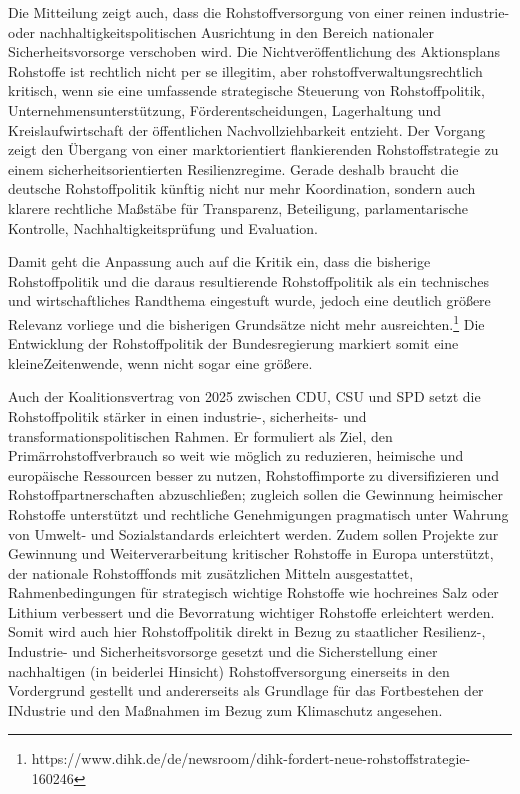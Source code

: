 \documentclass[12pt,a4paper,oneside]{book} %
\begin{document}
Die Mitteilung zeigt auch, dass die Rohstoffversorgung von einer reinen industrie- oder nachhaltigkeitspolitischen Ausrichtung in den Bereich nationaler Sicherheitsvorsorge verschoben wird. Die Nichtveröffentlichung des Aktionsplans Rohstoffe ist rechtlich nicht per se illegitim, aber rohstoffverwaltungsrechtlich kritisch, wenn sie eine umfassende strategische Steuerung von Rohstoffpolitik, Unternehmensunterstützung, Förderentscheidungen, Lagerhaltung und Kreislaufwirtschaft der öffentlichen Nachvollziehbarkeit entzieht. Der Vorgang zeigt den Übergang von einer marktorientiert flankierenden Rohstoffstrategie zu einem sicherheitsorientierten Resilienzregime. Gerade deshalb braucht die deutsche Rohstoffpolitik künftig nicht nur mehr Koordination, sondern auch klarere rechtliche Maßstäbe für Transparenz, Beteiligung, parlamentarische Kontrolle, Nachhaltigkeitsprüfung und Evaluation.

Damit geht die Anpassung auch auf die Kritik ein, dass die bisherige Rohstoffpolitik und die daraus resultierende Rohstoffpolitik als ein technisches und wirtschaftliches Randthema eingestuft wurde, jedoch eine deutlich größere Relevanz vorliege und die bisherigen Grundsätze nicht mehr ausreichten.\footnote{https://www.dihk.de/de/newsroom/dihk-fordert-neue-rohstoffstrategie-160246} Die Entwicklung der Rohstoffpolitik der Bundesregierung markiert somit eine \glqq kleine\grqq Zeitenwende,\autocite{FRenz 2025, S. 758} wenn nicht sogar eine größere.

Auch der Koalitionsvertrag von 2025 zwischen CDU, CSU und SPD setzt die Rohstoffpolitik stärker in einen industrie-, sicherheits- und transformationspolitischen Rahmen. Er formuliert als Ziel, den Primärrohstoffverbrauch so weit wie möglich zu reduzieren, heimische und europäische Ressourcen besser zu nutzen, Rohstoffimporte zu diversifizieren und Rohstoffpartnerschaften abzuschließen; zugleich sollen die Gewinnung heimischer Rohstoffe unterstützt und rechtliche Genehmigungen pragmatisch unter Wahrung von Umwelt- und Sozialstandards erleichtert werden. Zudem sollen Projekte zur Gewinnung und Weiterverarbeitung kritischer Rohstoffe in Europa unterstützt, der nationale Rohstofffonds mit zusätzlichen Mitteln ausgestattet, Rahmenbedingungen für strategisch wichtige Rohstoffe wie hochreines Salz oder Lithium verbessert und die Bevorratung wichtiger Rohstoffe erleichtert werden. Somit wird auch hier Rohstoffpolitik direkt in Bezug zu staatlicher Resilienz-, Industrie- und Sicherheitsvorsorge gesetzt und die Sicherstellung einer nachhaltigen (in beiderlei Hinsicht) Rohstoffversorgung einerseits in den Vordergrund gestellt und andererseits als Grundlage für das Fortbestehen der INdustrie und den Maßnahmen im Bezug zum Klimaschutz angesehen.
\end{document}
